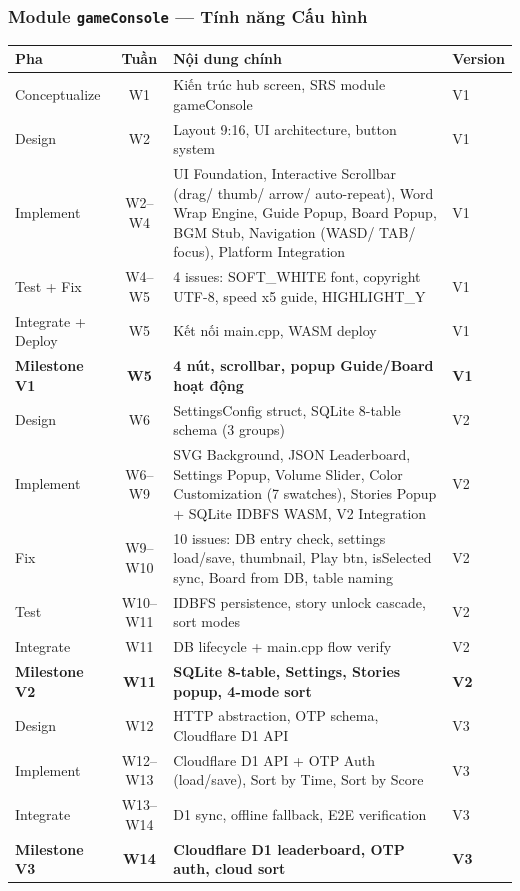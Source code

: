 \documentclass[12pt,a4paper]{article}
\begin{document}
\newpage %

\subsubsection{Module \texttt{gameConsole} --- Tính năng Cấu hình}

{\small
\begin{tabularx}{\linewidth}{|l|c|L|l|}
\hline
{}
\textbf{Pha} & \textbf{Tuần} & \textbf{Nội dung chính} & \textbf{Version} \\
\hline
Conceptualize & W1 & Kiến trúc hub screen, SRS module gameConsole & V1 \\
\hline
Design & W2 & Layout 9:16, UI architecture, button system & V1 \\
\hline
Implement & W2--W4 & UI Foundation, Interactive Scrollbar (drag/ thumb/ arrow/ auto-repeat), Word Wrap Engine, Guide Popup, Board Popup, BGM Stub, Navigation (WASD/ TAB/ focus), Platform Integration & V1 \\
\hline
Test + Fix & W4--W5 & 4 issues: SOFT\_WHITE font, copyright UTF-8, speed x5 guide, HIGHLIGHT\_Y & V1 \\
\hline
Integrate + Deploy & W5 & Kết nối main.cpp, WASM deploy & V1 \\
\hline
{}
\textbf{Milestone V1} & \textbf{W5} & \textbf{4 nút, scrollbar, popup Guide/Board hoạt động} & \textbf{V1} \\
\hline
Design & W6 & SettingsConfig struct, SQLite 8-table schema (3 groups) & V2 \\
\hline
Implement & W6--W9 & SVG Background, JSON Leaderboard, Settings Popup, Volume Slider, Color Customization (7 swatches), Stories Popup + SQLite IDBFS WASM, V2 Integration & V2 \\
\hline
Fix & W9--W10 & 10 issues: DB entry check, settings load/save, thumbnail, Play btn, isSelected sync, Board from DB, table naming & V2 \\
\hline
Test & W10--W11 & IDBFS persistence, story unlock cascade, sort modes & V2 \\
\hline
Integrate & W11 & DB lifecycle + main.cpp flow verify & V2 \\
\hline
{}
\textbf{Milestone V2} & \textbf{W11} & \textbf{SQLite 8-table, Settings, Stories popup, 4-mode sort} & \textbf{V2} \\
\hline
Design & W12 & HTTP abstraction, OTP schema, Cloudflare D1 API & V3 \\
\hline
Implement & W12--W13 & Cloudflare D1 API + OTP Auth (load/save), Sort by Time, Sort by Score & V3 \\
\hline
Integrate & W13--W14 & D1 sync, offline fallback, E2E verification & V3 \\
\hline
{}
\textbf{Milestone V3} & \textbf{W14} & \textbf{Cloudflare D1 leaderboard, OTP auth, cloud sort} & \textbf{V3} \\
\hline
\end{tabularx}
}
\end{document}
